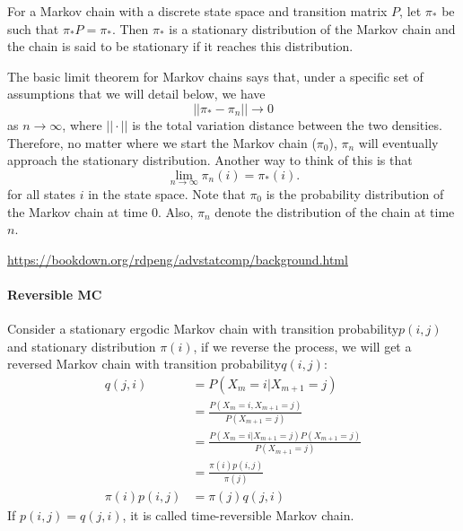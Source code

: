 For a Markov chain with a discrete state space and transition matrix $P$, let $\pi_*$ be such that $\pi_*P=\pi_*$. Then $\pi_*$ is a stationary distribution of the Markov chain and the chain is said to be stationary if it reaches this distribution.

The basic limit theorem for Markov chains says that, under a specific set of assumptions that we will detail below, we have 
$$||\pi_*-\pi_n|| \to 0$$
as $n\to\infty$, where $||\cdot||$ is the total variation distance between the two densities. Therefore, no matter where we start the Markov chain ($\pi_0$), $\pi_n$ will eventually approach the stationary distribution. Another way to think of this is that 
$$\lim_{n\to\infty}\pi_n(i)=\pi_*(i).$$
for all states $i$ in the state space. Note that $\pi_0$ is the probability distribution of the Markov chain at time 0. Also, $\pi_n$ denote the distribution of the chain at time $n$.

\url{https://bookdown.org/rdpeng/advstatcomp/background.html}


\paragraph{Reversible MC}
Consider a stationary ergodic Markov chain with transition probability$p(i, j)$ and stationary distribution $\pi(i)$, if we reverse the process, we will get a reversed Markov chain with transition probability$q(i, j)$: 
\begin{align*}
	q(j,i) &= P(X_m=i|X_{m+1}=j)\\
		   &= \frac{P(X_m=i,X_{m+1}=j)}{P(X_{m+1}=j)}\\
		   &= \frac{P(X_m=i|X_{m+1}=j)P(X_{m+1}=j)}{P(X_{m+1}=j)}\\
		   &= \frac{\pi(i)p(i,j)}{\pi(j)}\\
	\pi(i)p(i,j) &= \pi(j)q(j,i)
\end{align*}
If $p(i,j) = q(j,i)$, it is called time-reversible Markov chain. 


